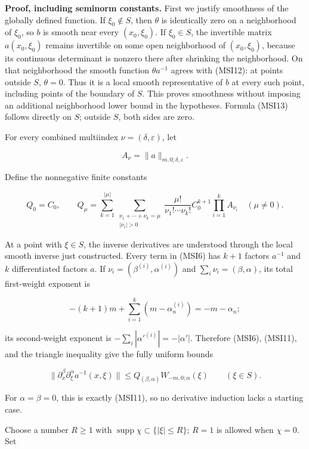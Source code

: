 \documentclass[
  11pt,
]{article}
\begin{document}
\textbf{Proof, including seminorm constants.} First we justify
smoothness of the globally defined function. If \(\xi_0\notin S\), then
\(\theta\) is identically zero on a neighborhood of \(\xi_0\), so \(b\)
is smooth near every \((x_0,\xi_0)\). If \(\xi_0\in S\), the invertible
matrix \(a(x_0,\xi_0)\) remains invertible on some open neighborhood of
\((x_0,\xi_0)\), because its continuous determinant is nonzero there
after shrinking the neighborhood. On that neighborhood the smooth
function \(\theta a^{-1}\) agrees with (MSI12): at points outside \(S\),
\(\theta=0\). Thus it is a local smooth representative of \(b\) at every
such point, including points of the boundary of \(S\). This proves
smoothness without imposing an additional neighborhood lower bound in
the hypotheses. Formula (MSI13) follows directly on \(S\); outside
\(S\), both sides are zero.

For every combined multiindex \(\nu=(\delta,\varepsilon)\), let

\[
A_\nu=\|a\|_{m,0;\delta,\varepsilon}.
\tag{MSI15}
\]

Define the nonnegative finite constants

\[
Q_0=C_0,
\qquad
Q_\mu=
\sum_{k=1}^{|\mu|}
 \sum_{\substack{\nu_1+\cdots+\nu_k=\mu\\|\nu_i|>0}}
 \frac{\mu!}{\nu_1!\cdots\nu_k!}
 C_0^{k+1}\prod_{i=1}^{k}A_{\nu_i}
\quad(\mu\ne0).
\tag{MSI16}
\]

At a point with \(\xi\in S\), the inverse derivatives are understood
through the local smooth inverse just constructed. Every term in (MSI6)
has \(k+1\) factors \(a^{-1}\) and \(k\) differentiated factors \(a\).
If \(\nu_i=(\beta^{(i)},\alpha^{(i)})\) and
\(\sum_i\nu_i=(\beta,\alpha)\), its total first-weight exponent is

\[
-(k+1)m+\sum_{i=1}^{k}(m-\alpha_n^{(i)})
=-m-\alpha_n;
\tag{MSI17}
\]

its second-weight exponent is \(-\sum_i|\alpha'^{(i)}|=-|\alpha'|\).
Therefore (MSI6), (MSI11), and the triangle inequality give the fully
uniform bounds

\[
\|\partial_x^\beta\partial_\xi^\alpha a^{-1}(x,\xi)\|
\leq Q_{(\beta,\alpha)}W_{-m,0;\alpha}(\xi)
\qquad (\xi\in S).
\tag{MSI18}
\]

For \(\alpha=\beta=0\), this is exactly (MSI11), so no derivative
induction lacks a starting case.

Choose a number \(R\geq1\) with
\(\operatorname{supp}\chi\subset\{|\xi|\leq R\}\); \(R=1\) is allowed
when \(\chi=0\). Set
\end{document}

